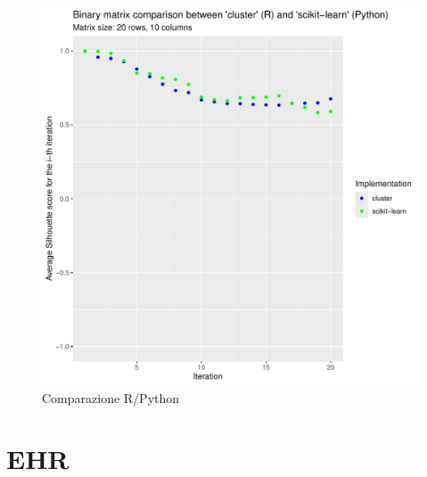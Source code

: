 \documentclass{beamer}
\begin{document}
\begin{frame}
\begin{boxedminipage}{0.49\textwidth}
\begin{figure}
                    \includegraphics[width = \textwidth, page = 1]{results/Final_comparison.pdf}
                    \caption{Comparazione R/Python}
                \end{figure}
            \end{boxedminipage}
        \end{frame}

    \section{EHR}
\end{document}
